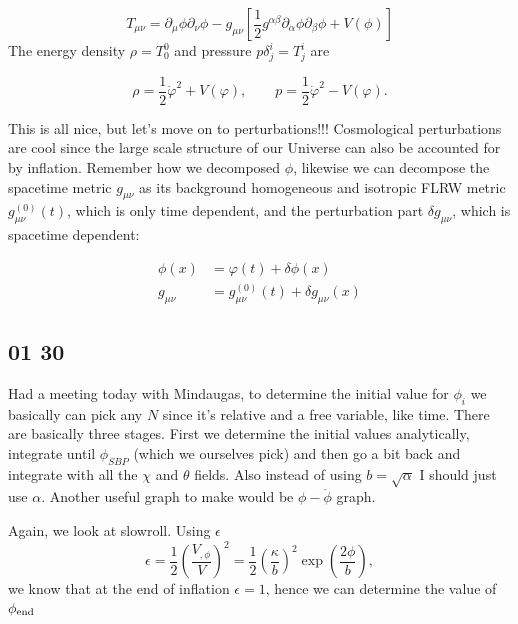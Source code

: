 \begin{equation*}
    T_{\mu\nu} = \partial_\mu \phi \partial_\nu \phi - g_{\mu \nu} \left[ \frac{1}{2} g^{\alpha\beta} \partial_\alpha \phi \partial_\beta \phi + V(\phi) \right]
\end{equation*}
The energy density $\rho = T^0_0$ and pressure $p \delta^i_j = T^i_j$ are

\begin{equation*}
    \rho = \frac{1}{2} \dot{\varphi}^2 + V(\varphi), \qquad p = \frac{1}{2} \dot{\varphi}^2 - V(\varphi).
\end{equation*}

This is all nice, but let's move on to perturbations!!! Cosmological perturbations are cool since the large scale structure of our Universe can also be accounted for by inflation. Remember how we decomposed $\phi$, likewise we can decompose the spacetime metric $g_{\mu \nu}$ as its background homogeneous and isotropic FLRW metric $g^(0)_{\mu \nu}(t)$, which is only time dependent, and the perturbation part $\delta g_{\mu \nu}$, which is spacetime dependent:

\begin{align*}
    \phi(x) &= \varphi(t) + \delta \phi(x)\\
    g_{\mu \nu} &= g^{(0)}_{\mu \nu}(t) + \delta g_{\mu \nu}(x)
\end{align*}


\subsection*{01 30}
Had a meeting today with Mindaugas, to determine the initial value for $\phi_i$ we basically can pick any $N$ since it's relative and a free variable, like time. There are basically three stages. First we determine the initial values analytically, integrate until $\phi_{SBP}$ (which we ourselves pick) and then go a bit back and integrate with all the $\chi$ and $\theta$ fields. Also instead of using $b = \sqrt{\alpha}$ I should just use $\alpha$. Another useful graph to make would be $\phi-\dot{\phi}$ graph.

Again, we look at slowroll. Using $\epsilon$
\begin{equation*}
    \epsilon = \frac{1}{2} \left( \frac{V_{, \phi}}{V} \right)^2 = \frac{1}{2} \left( \frac{\kappa}{b} \right)^2 \exp \left( \frac{2 \phi}{b} \right),
\end{equation*}
we know that at the end of inflation $\epsilon = 1$, hence we can determine the value of $\phi_{\rm end}$

